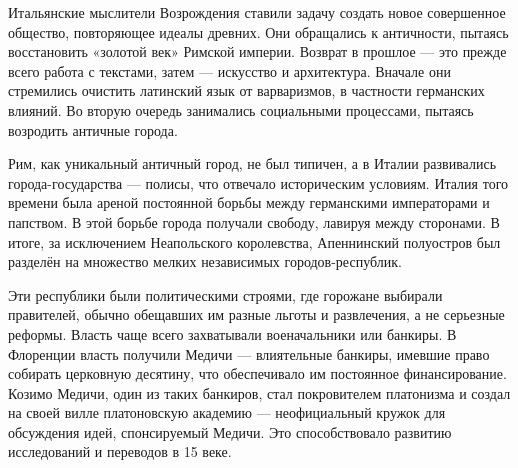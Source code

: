 
Итальянские мыслители Возрождения ставили задачу создать новое совершенное общество, повторяющее идеалы древних. Они обращались к античности, пытаясь восстановить «золотой век» Римской империи. Возврат в прошлое --- это прежде всего работа с текстами, затем --- искусство и архитектура. Вначале они стремились очистить латинский язык от варваризмов, в частности германских влияний. Во вторую очередь занимались социальными процессами, пытаясь возродить античные города.

Рим, как уникальный античный город, не был типичен, а в Италии развивались города-государства --- полисы, что отвечало историческим условиям. Италия того времени была ареной постоянной борьбы между германскими императорами и папством. В этой борьбе города получали свободу, лавируя между сторонами. В итоге, за исключением Неапольского королевства, Апеннинский полуостров был разделён на множество мелких независимых городов-республик.

Эти республики были политическими строями, где горожане выбирали правителей, обычно обещавших им разные льготы и развлечения, а не серьезные реформы. Власть чаще всего захватывали военачальники или банкиры. В Флоренции власть получили Медичи --- влиятельные банкиры, имевшие право собирать церковную десятину, что обеспечивало им постоянное финансирование. Козимо Медичи, один из таких банкиров, стал покровителем платонизма и создал на своей вилле платоновскую академию --- неофициальный кружок для обсуждения идей, спонсируемый Медичи. Это способствовало развитию исследований и переводов в 15 веке.

